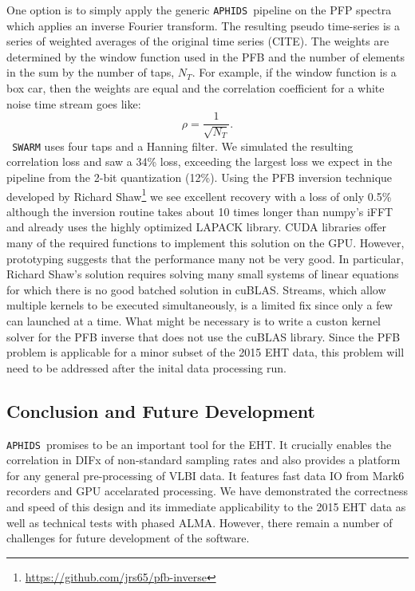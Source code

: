 \documentclass[11pt,preprint]{aastex}
\newcommand{\SWARM}[1]{\texttt{#1\,SWARM}}
\newcommand{\APHIDS}{\texttt{APHIDS}}
\begin{document}
One option is to simply apply the generic \APHIDS\, pipeline on the PFP spectra which applies an inverse Fourier 
transform.  The resulting pseudo time-series is a series of weighted 
averages of the original time series (CITE).  The weights are determined by the window function used in the 
PFB and the number of elements in the sum by the number of taps, $N_T$.  For example, if the window function is 
a box car, then the weights are equal and the correlation coefficient for a white noise time stream goes like:
\begin{equation}
\rho = \frac{1}{\sqrt{N_T}}.
\end{equation}
\SWARM{} uses four taps and a Hanning filter.  We simulated the resulting correlation loss and saw a 34\% loss, 
exceeding the largest loss we expect in the pipeline from the 2-bit quantization (12\%).  Using the PFB inversion
technique developed by Richard Shaw\footnote{\url{https://github.com/jrs65/pfb-inverse}} we see excellent 
recovery with a loss of only 0.5\% although the inversion routine takes about 10 times longer than numpy's
iFFT and already uses the highly optimized LAPACK library.  CUDA libraries offer many of the required functions 
to implement this solution on the GPU.  However, prototyping suggests that the performance many not be very good. 
In particular, Richard Shaw's solution requires solving many small systems of linear equations for which there is 
no good batched solution in cuBLAS. Streams, which allow multiple kernels to be executed simultaneously, is a 
limited fix since only a few can launched at a time.  What might be necessary is to write a custon kernel solver
for the PFB inverse that does not use the cuBLAS library.  Since the PFB problem is applicable for a minor subset 
of the 2015 EHT data, this problem will need to be addressed after the inital data processing run.

\subsection{Conclusion and Future Development}

\APHIDS\, promises to be an important tool for the EHT.  It crucially enables the correlation in
DIFx of non-standard sampling rates and also provides a platform for any general pre-processing of 
VLBI data.  It features fast data IO from Mark6 recorders and GPU accelarated processing.  
We have demonstrated the correctness and speed of this design and its immediate applicability to 
the 2015 EHT data as well as technical tests with phased ALMA.  However,
there remain a number of challenges for future development of the software.
\end{document}
